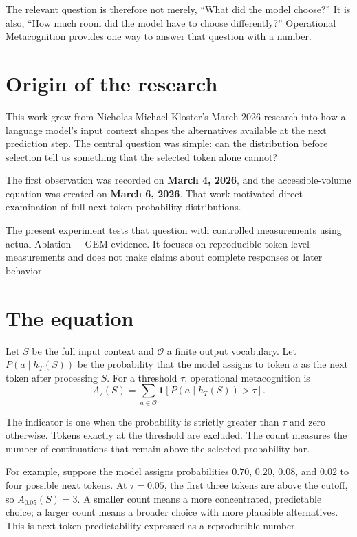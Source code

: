 \documentclass[11pt,a4paper]{article}
\begin{document}
The relevant question is therefore not merely, ``What did the model choose?'' It is also, ``How much room did the model have to choose differently?'' Operational Metacognition provides one way to answer that question with a number.

\section{Origin of the research}
This work grew from Nicholas Michael Kloster's March 2026 research into how a language model's input context shapes the alternatives available at the next prediction step. The central question was simple: can the distribution before selection tell us something that the selected token alone cannot?

The first observation was recorded on \textbf{March 4, 2026}, and the accessible-volume equation was created on \textbf{March 6, 2026}. That work motivated direct examination of full next-token probability distributions.

The present experiment tests that question with controlled measurements using actual Ablation + GEM evidence. It focuses on reproducible token-level measurements and does not make claims about complete responses or later behavior.

\section{The equation}
Let $S$ be the full input context and $\mathcal{O}$ a finite output vocabulary. Let $P(a\mid h_T(S))$ be the probability that the model assigns to token $a$ as the next token after processing $S$. For a threshold $\tau$, operational metacognition is
\begin{equation}
A_\tau(S)=\sum_{a\in\mathcal{O}}\mathbf{1}\!\left[P(a\mid h_T(S))>\tau\right].
\label{eq:accessible-volume}
\end{equation}

The indicator is one when the probability is strictly greater than $\tau$ and zero otherwise. Tokens exactly at the threshold are excluded. The count measures the number of continuations that remain above the selected probability bar.

For example, suppose the model assigns probabilities $0.70$, $0.20$, $0.08$, and $0.02$ to four possible next tokens. At $\tau=0.05$, the first three tokens are above the cutoff, so $A_{0.05}(S)=3$. A smaller count means a more concentrated, predictable choice; a larger count means a broader choice with more plausible alternatives. This is next-token predictability expressed as a reproducible number.
\end{document}
